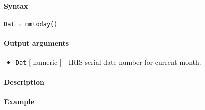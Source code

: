 


	\paragraph{Syntax}\label{syntax}

\begin{verbatim}
Dat = mmtoday()
\end{verbatim}

\paragraph{Output arguments}\label{output-arguments}

\begin{itemize}
\itemsep1pt\parskip0pt
\item
  \texttt{Dat} {[} numeric {]} - IRIS serial date number for current
  month.
\end{itemize}

\paragraph{Description}\label{description}

\paragraph{Example}\label{example}


